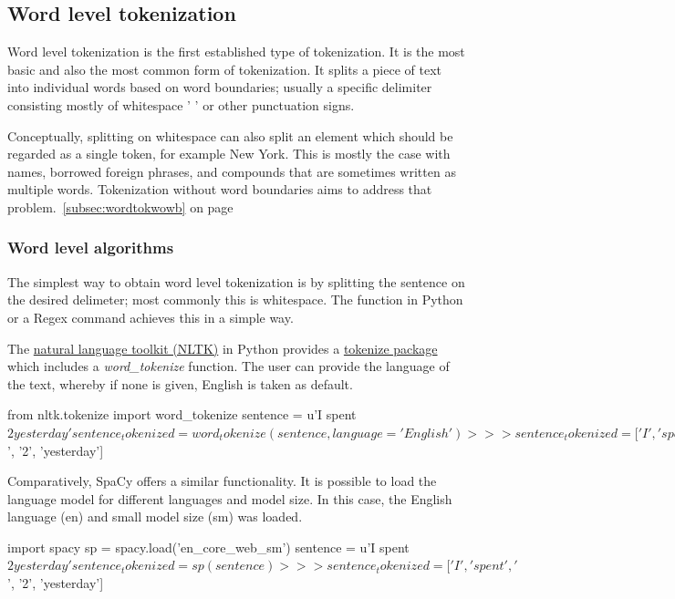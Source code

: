 \subsection{Word level tokenization}

Word level tokenization is the first established type of tokenization. It is the most basic and also the most common form of tokenization. It splits a piece of text into individual words based on word boundaries; usually a specific delimiter consisting mostly of whitespace ' ' or other punctuation signs.

Conceptually, splitting on whitespace can also split an element which should be regarded as a single token, for example New York. This is mostly the case with names, borrowed foreign phrases, and compounds that are sometimes written as multiple words. Tokenization without word boundaries aims to address that problem.~\ref{subsec:wordtokwowb} on page~\pageref{subsec:wordtokwowb}

\subsubsection{Word level algorithms}

The simplest way to obtain word level tokenization is by splitting the sentence on the desired delimeter; most commonly this is whitespace. The  function in Python or a Regex command  achieves this in a simple way.

The \href{https://www.nltk.org/}{natural language toolkit (NLTK)} in Python provides a \href{https://www.nltk.org/api/nltk.tokenize.html}{tokenize package} which includes a \emph{word\_tokenize} function. The user can provide the language of the text, whereby if none is given, English is taken as default.

\begin{python}
from nltk.tokenize import word_tokenize
sentence = u'I spent $2 yesterday'
sentence_tokenized = word_tokenize(sentence, language='English')
>>> sentence_tokenized = ['I', 'spent', '$', '2', 'yesterday']
\end{python}

Comparatively, SpaCy offers a similar functionality. It is possible to load the language model for different languages and model size. In this case, the English language (en) and small model size (sm) was loaded.

\begin{python}
import spacy
sp = spacy.load('en_core_web_sm')
sentence = u'I spent $2 yesterday'
sentence_tokenized = sp(sentence)
>>> sentence_tokenized = ['I', 'spent', '$', '2', 'yesterday']
\end{python}

